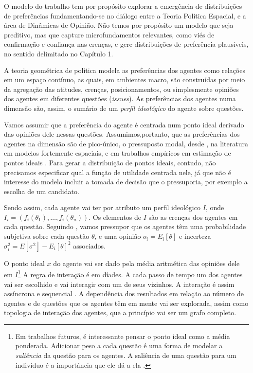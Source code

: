 O modelo do trabalho tem por propósito explorar a emergência de distribuições de
preferências fundamentando-se no diálogo entre a Teoria Política Espacial, e a
área de Dinâmicas de Opinião. Não temos por propósito um modelo que seja
preditivo, mas que capture microfundamentos relevantes, como viés de confirmação
e confiança nas crenças, e gere distribuições de
preferência plausíveis, no sentido delimitado no Capítulo 1.

A teoria geométrica de política modela as preferências dos agentes como relações
em um espaço contínuo, as quais, em ambientes macro, são construídas por meio da
agregação das atitudes, crenças, posicionamentos, ou simplesmente opiniões dos
agentes em diferentes questões (\textit{issues}). As preferências dos agentes
numa dimensão são, assim, o sumário de um \textit{perfil ideológico} do agente
sobre questões.

Vamos assumir que a preferência do agente é centrada num ponto ideal derivado
das opiniões dele nessas questões. Assumimos,portanto, que as preferências dos
agentes na dimensão são de pico-único, o pressuposto modal, desde
, na literatura em modelos fortemente espaciais, e
em trabalhos empíricos em estimação de pontos ideais \cite{carroll2013structure,
  armstrong2014analyzing}. Para gerar a distribuição de pontos ideais, contudo,
não precisamos especificar qual a função de utilidade centrada nele, já que não
é interesse do modelo incluir a tomada de decisão que o pressuporia, por exemplo
a escolha de um candidato.

Sendo assim, cada agente vai ter por atributo um perfil ideológico \(I\), onde
\(I_i = (f_i(\theta_1), \ldots, f_i(\theta_n)) \). Os elementos de \(I\) são as crenças dos
agentes em cada questão. Seguindo , vamos pressupor
que os agentes têm uma probabilidade subjetiva sobre cada questão \(\theta\), e uma
opinião \( o_i = E_i[\theta]\) e incerteza \( \sigma_i^2 = E[\sigma^2] - E_ i[\theta]^2\)
associados.

O ponto ideal \(x\) do agente vai ser dado pela média aritmética das opiniões
dele em \(I\)\footnote{Em trabalhos futuros, é interessante pensar o ponto ideal
  como a média ponderada. Adicionar peso a cada questão é uma forma de modelar a
  \textit{saliência} da questão para os agentes. A saliência de uma questão para
  um indivíduo é a importância que ele dá a ela \cite{munger2015choosing}.} A
regra de interação é em díades. A cada passo de tempo um dos agentes vai ser
escolhido e vai interagir com um de seus vizinhos. A interação é assim
assíncrona e sequencial \cite{wilensky2015introduction}. A dependência dos
resultados em relação ao número de agentes e de questões que os agentes têm em
mente vai ser explorada, assim como topologia de interação dos agentes, que a
princípio vai ser um grafo completo.


